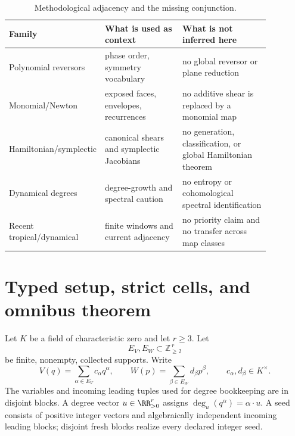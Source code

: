 \documentclass[11pt]{article}
\theoremstyle{definition}
\theoremstyle{remark}
\begin{document}
\begin{table}[t]
\centering
\small
\caption{Methodological adjacency and the missing conjunction.}
\label{tab:related}
\begin{tabular}{p{0.23\linewidth}p{0.30\linewidth}p{0.34\linewidth}}
\toprule
Family & What is used as context & What is not inferred here\\
\midrule
Polynomial reversors & phase order, symmetry vocabulary
  \cite{gomez_meiss_2004,shafikov_wolf_2003} &
  no global reversor or plane reduction\\
Monomial/Newton & exposed faces, envelopes, recurrences
  \cite{hasselblatt_propp_2007,bedford_kim_2008,favre_wulcan_2012,
  el_hilany_2024,grigoriev_containment} &
  no additive shear is replaced by a monomial map\\
Hamiltonian/symplectic & canonical shears and symplectic Jacobians
  \cite{fordy_hone_2011,koch_lomeli_2014,janeczko_jelonek_2008,
  berger_turaev_2025} &
  no generation, classification, or global Hamiltonian theorem\\
Dynamical degrees & degree-growth and spectral caution
  \cite{blanc_van_santen_2022,dang_favre_2021,
  bianchi_dinh_rakhimov_2024,shao_sun_2025} &
  no entropy or cohomological spectral identification\\
Recent tropical/dynamical & finite windows and current adjacency
  \cite{takenawa_2026,nisse_2026,abboud_xie_2026,
  deserti_2018,cheng_wang_yu_1994} &
  no priority claim and no transfer across map classes\\
\bottomrule
\end{tabular}
\end{table}

\section{Typed setup, strict cells, and omnibus theorem}

Let $K$ be a field of characteristic zero and let $r\geq3$.  Let
\[
 E_V,E_W\subset\mathbb Z_{\geq2}^{\,r}
\]
be finite, nonempty, collected supports.  Write
\[
 V(q)=\sum_{\alpha\in E_V}c_\alpha q^\alpha,\qquad
 W(p)=\sum_{\beta\in E_W}d_\beta p^\beta,
 \qquad c_\alpha,d_\beta\in K^\times .
\]
The variables and incoming leading tuples used for degree bookkeeping are
in disjoint blocks.  A degree vector $u\in\RR_{>0}^r$ assigns
$\deg_u(q^\alpha)=\alpha\cdot u$.  A seed consists of positive integer
vectors and algebraically independent incoming leading blocks; disjoint
fresh blocks realize every declared integer seed.
\end{document}
